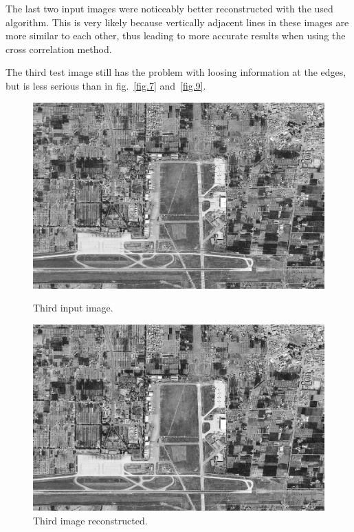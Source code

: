 \documentclass[a4paper,12pt]{article}
\begin{document}
The last two input images were noticeably better reconstructed with the used algorithm. This is very likely because vertically adjacent lines in these images are more similar to each other, thus leading to more accurate results when using the cross correlation method. 

The third test image still has the problem with loosing information at the edges, but is less serious than in fig.~\ref{fig.7} and~\ref{fig.9}. 

\begin{figure}[h]
\centering
\begin{minipage}{.5\textwidth}
  \centering
  \includegraphics[width=0.95\linewidth]{img/desync3}
  \caption{Third input image.}
  \label{fig.10}
\end{minipage}%
\begin{minipage}{.5\textwidth}
  \centering
  \includegraphics[width=0.95\linewidth]{img/sync3}
  \caption{Third image reconstructed.}
  \label{fig.11}
\end{minipage}
\end{figure}
\end{document}
